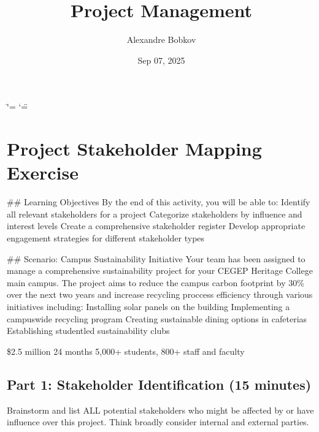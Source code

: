 \documentclass[letterpaper,10pt,english]{sphinxmanual}
\title{Project Management}
\date{Sep 07, 2025}
\author{Alexandre Bobkov}
\begin{document}
\ifdefined\shorthandoff
  \ifnum\catcode`\=\string=\active\shorthandoff{=}\fi
  \ifnum\catcode`\"=\active{}\fi
\fi

\pagestyle{empty}
\sphinxmaketitle
\pagestyle{plain}
\sphinxtableofcontents
\pagestyle{normal}
\label{\detokenize{index::doc}}


\sphinxstepscope


\chapter{Project Stakeholder Mapping Exercise}
\label{\detokenize{mapping_stakeholder:project-stakeholder-mapping-exercise}}\label{\detokenize{mapping_stakeholder::doc}}
\sphinxAtStartPar
\#\# Learning Objectives
By the end of this activity, you will be able to:
\sphinxhyphen{} Identify all relevant stakeholders for a project
\sphinxhyphen{} Categorize stakeholders by influence and interest levels
\sphinxhyphen{} Create a comprehensive stakeholder register
\sphinxhyphen{} Develop appropriate engagement strategies for different stakeholder types

\sphinxAtStartPar
\#\# Scenario: Campus Sustainability Initiative
Your team has been assigned to manage a comprehensive sustainability project for your CEGEP Heritage College main campus. The project aims to reduce the campus carbon footprint by 30\% over the next two years and increase recycling proccess efficiency through various initiatives including:
\sphinxhyphen{} Installing solar panels on the building
\sphinxhyphen{} Implementing a campus\sphinxhyphen{}wide recycling program
\sphinxhyphen{} Creating sustainable dining options in cafeterias
\sphinxhyphen{} Establishing student\sphinxhyphen{}led sustainability clubs

\sphinxAtStartPar
{} \$2.5 million
 24 months
 5,000+ students, 800+ staff and faculty


\section{Part 1: Stakeholder Identification (15 minutes)}
\label{\detokenize{mapping_stakeholder:part-1-stakeholder-identification-15-minutes}}
\sphinxAtStartPar
{} Brainstorm and list ALL potential stakeholders who might be affected by or have influence over this project. Think broadly \sphinxhyphen{} consider internal and external parties.
\end{document}
